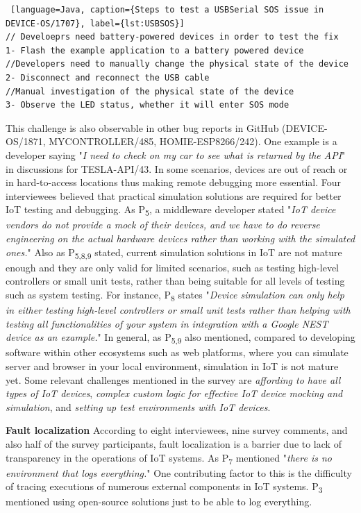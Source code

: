 { \begin{lstlisting} [language=Java, caption={Steps to test a USBSerial SOS issue in DEVICE-OS/1707}, label={lst:USBSOS}] 
// Develoeprs need battery-powered devices in order to test the fix
1- Flash the example application to a battery powered device
//Developers need to manually change the physical state of the device
2- Disconnect and reconnect the USB cable
//Manual investigation of the physical state of the device
3- Observe the LED status, whether it will enter SOS mode
\end{lstlisting}

This challenge is also observable in other bug reports in GitHub (DEVICE-OS/1871, MYCONTROLLER/485, HOMIE-ESP8266/242). 
One example is a developer saying "\emph{I need to check on my car to see what is returned by the API}" in discussions for TESLA-API/43.
In some scenarios, devices are out of reach or in hard-to-access locations thus making remote debugging more essential. 
Four interviewees believed that practical simulation solutions are required for better IoT testing and debugging. As P\textsubscript{5}, a middleware developer stated "\emph{IoT device vendors do not provide a mock of their devices, and we have to do reverse engineering on the actual hardware devices rather than working with the simulated ones.}" Also as P\textsubscript{5,8,9} stated, current simulation solutions in IoT are not mature enough and they are only valid for limited scenarios, such as testing high-level controllers or small unit tests, rather than being suitable for all levels of testing such as system testing.
 For instance, P\textsubscript{8} states "\emph{Device simulation can only help in either testing high-level controllers or small unit tests rather than helping with testing all functionalities of your system in integration with a Google NEST device as an example.}"
 In general, as P\textsubscript{5,9} also mentioned, compared to developing software within other ecosystems such as web platforms, where you can simulate server and browser in your local environment, simulation in IoT is not mature yet.
Some relevant challenges mentioned in the survey are \emph{affording to have all types of IoT devices}, \emph{complex custom logic for effective IoT device mocking and simulation}, and \emph{setting up test environments with IoT devices}. 

\textbf{Fault localization}
According to eight interviewees, nine survey comments, and also half of the survey participants, fault localization is a barrier due to lack of transparency in the operations of IoT systems. As P\textsubscript{7} mentioned "\emph{there is no environment that logs everything.}" One contributing factor to this is the difficulty of tracing executions of numerous external components in IoT systems. P\textsubscript{3} mentioned using open-source solutions just to be able to log everything. 


}
